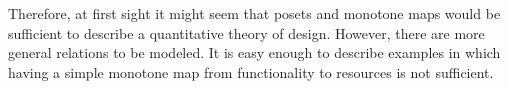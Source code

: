 \begin{comment}
    \begin{figure}[h!]
        \centering
        \begin{tikzcd}
            \bullet &\arrow[l] \bullet\\[-15pt]
            \text{mass} & \text{capacity}
        \end{tikzcd}
        \caption{Example of the design of a battery. }
        \label{fig:battery-example}
    \end{figure}
\end{comment}

Therefore, at first sight it might seem that posets and monotone maps would be sufficient to describe a quantitative theory of design.
However, there are more general relations to be modeled.
It is easy enough to describe examples in which having a simple monotone map from functionality to resources is not sufficient.

